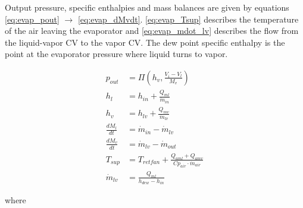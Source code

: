 \medskip
Output pressure, specific enthalpies and mass balances are given by equations \cref{eq:evap_pout} $\rightarrow$ \cref{eq:evap_dMvdt}. \cref{eq:evap_Tsup} describes the temperature of the air leaving the evaporator and \cref{eq:evap_mdot_lv} describes the flow from the liquid-vapor CV to the vapor CV. The dew point specific enthalpy is the point at the evaporator pressure where liquid turns to vapor.

\begin{align}
	p_{out}         & = \Pi \left( h_v, \frac{V_i-V_l}{M_v} \right)		\label{eq:evap_pout}                       \\
	h_l             & = h_{in} + \frac{Q_{ml}}{\dot{m}_{in}}                                                       \\
	h_v             & = h_{lv} + \frac{Q_{mv}}{\dot{m}_{lv}}                                                       \\
	\frac{dM_l}{dt} & = \dot{m}_{in} - \dot{m}_{lv}                                                                \\
	\frac{dM_v}{dt} & = \dot{m}_{lv} - \dot{m}_{out}                   \label{eq:evap_dMvdt}                       \\
	T_{sup}         & = T_{retfan} +  \frac{Q_{aml} + Q_{amv}}{Cp_{air} \cdot \dot{m}_{air}} \label{eq:evap_Tsup} \\
	\dot{m}_{lv}    & = \frac{Q_{ml}}{h_{dew} - h_{in}} \label{eq:evap_mdot_lv}
\end{align}



where\\


